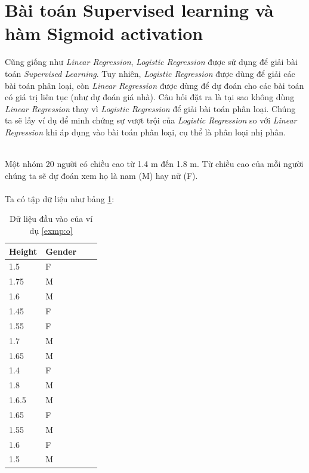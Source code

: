 \section{Bài toán Supervised learning và hàm Sigmoid activation}
Cũng giống như \textit{Linear Regression}, \textit{Logistic Regression} được sử dụng để giải bài toán \textit{Supervised Learning}. Tuy nhiên, \textit{Logistic Regression} được dùng để giải các bài toán phân loại, còn \textit{Linear Regression} được dùng để dự đoán cho các bài toán có giá trị liên tục (như dự đoán giá nhà). Câu hỏi đặt ra là tại sao không dùng \textit{Linear Regression} thay vì \textit{Logistic Regression} để giải bài toán phân loại. Chúng ta sẽ lấy ví dụ để minh chứng sự vượt trội của \textit{Logistic Regression} so với \textit{Linear Regression} khi áp dụng vào bài toán phân loại, cụ thể là phân loại nhị phân.
\\
\begin{exmp}
\label{exmp:o}
\hrulefill\\
Một nhóm 20 người có chiều cao từ 1.4 m đến 1.8 m. Từ chiều cao của mỗi người chúng ta sẽ dự đoán xem họ là nam (M) hay nữ (F).\\
\\
Ta có tập dữ liệu như bảng \ref{Tab:ex}:\\
\begin{table}[ht]
\centering
\begin{tabular}{|l|l|l|l|}
\hline
Height & Gender \\ \hline
1.5   & F \\ \hline
1.75  & M \\ \hline
1.6     & M \\ \hline
1.45  & F  \\ \hline
1.55   & F \\ \hline
1.7  & M \\ \hline
1.65  & M \\ \hline
1.4     & F \\ \hline
1.8  & M \\ \hline
1.6.5   & M \\ \hline
1.65  & F \\ \hline
1.55   & M \\ \hline
1.6  & F \\ \hline
1.5   & M \\ \hline
\end{tabular}
\caption{Dữ liệu đầu vào của ví dụ \ref{exmp:o}}
\label{Tab:ex}
\end{table}
\end{exmp}

